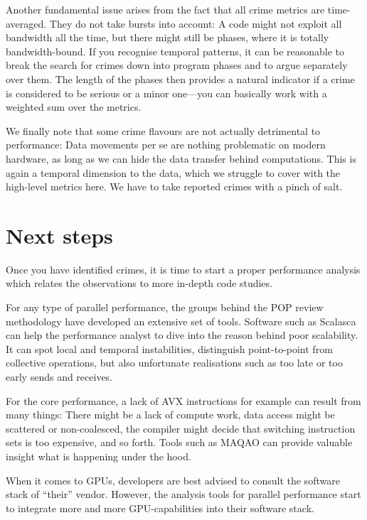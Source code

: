 Another fundamental issue arises from the fact that all crime metrics
are time-averaged. 
They do not take bursts into account: A code might not exploit all bandwidth all the time, but there might
still be phases, where it is totally bandwidth-bound. 
If you recognise temporal patterns, it can be reasonable to break the search for
crimes down into program phases and to argue separately over them.
The length of the phases then provides a natural indicator if a crime is
considered to be serious or a minor one---you can basically work with a weighted
sum over the metrics.


We finally note that some crime flavours are not actually detrimental to
performance:
Data movements per se are nothing problematic on modern hardware, as long as we
can hide the data transfer behind computations.
This is again a temporal dimension to the data, which we struggle to cover with
the high-level metrics here.
We have to take reported crimes with a pinch of salt.


\section{Next steps}

Once you have identified crimes, it is time to start a proper performance
analysis which relates the observations to more in-depth code studies.


For any type of parallel performance, the groups behind the POP review
methodology have developed an extensive set of tools.
Software such as Scalasca can help the performance analyst to dive into the
reason behind poor scalability.
It can spot local and temporal instabilities, distinguish point-to-point from
collective operations, but also unfortunate realisations such as too late or too
early sends and receives.


For the core performance, a lack of AVX instructions for example can result from
many things: 
There might be a lack of compute work, 
data access might be scattered or non-coalesced,
the compiler might decide that switching instruction sets is too expensive, 
and so forth.
Tools such as MAQAO \cite{MAQAO} can provide valuable insight what is happening
under the hood.


When it comes to GPUs, developers are best advised to consult the software stack
of ``their'' vendor. 
However, the analysis tools for parallel performance start to integrate more and
more GPU-capabilities into their software stack.